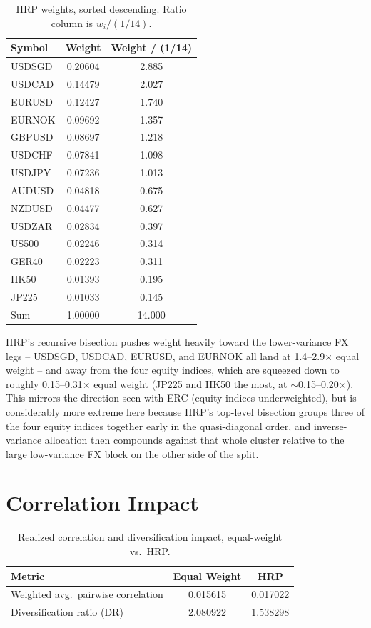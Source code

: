 \documentclass[11pt]{article}
\begin{document}
\begin{table}[h]
\centering
\caption{HRP weights, sorted descending. Ratio column is $w_i / (1/14)$.}
\begin{tabular}{lS[table-format=1.5]S[table-format=1.3]}
\toprule
Symbol & {Weight} & {Weight / (1/14)} \\
\midrule
USDSGD & 0.20604 & 2.885 \\
USDCAD & 0.14479 & 2.027 \\
EURUSD & 0.12427 & 1.740 \\
EURNOK & 0.09692 & 1.357 \\
GBPUSD & 0.08697 & 1.218 \\
USDCHF & 0.07841 & 1.098 \\
USDJPY & 0.07236 & 1.013 \\
AUDUSD & 0.04818 & 0.675 \\
NZDUSD & 0.04477 & 0.627 \\
USDZAR & 0.02834 & 0.397 \\
US500  & 0.02246 & 0.314 \\
GER40  & 0.02223 & 0.311 \\
HK50   & 0.01393 & 0.195 \\
JP225  & 0.01033 & 0.145 \\
\midrule
Sum & 1.00000 & 14.000 \\
\bottomrule
\end{tabular}
\end{table}

HRP's recursive bisection pushes weight heavily toward the lower-variance FX legs --
USDSGD, USDCAD, EURUSD, and EURNOK all land at 1.4--2.9$\times$ equal weight -- and
away from the four equity indices, which are squeezed down to roughly 0.15--0.31$\times$
equal weight (JP225 and HK50 the most, at $\sim$0.15--0.20$\times$). This mirrors the
direction seen with ERC (equity indices underweighted), but is considerably more
extreme here because HRP's top-level bisection groups three of the four equity indices
together early in the quasi-diagonal order, and inverse-variance allocation then
compounds against that whole cluster relative to the large low-variance FX block on
the other side of the split.

\section{Correlation Impact}

\begin{table}[h]
\centering
\caption{Realized correlation and diversification impact, equal-weight vs.\ HRP.}
\begin{tabular}{lS[table-format=1.6]S[table-format=1.6]}
\toprule
Metric & {Equal Weight} & {HRP} \\
\midrule
Weighted avg.\ pairwise correlation & 0.015615 & 0.017022 \\
Diversification ratio (DR) & 2.080922 & 1.538298 \\
\bottomrule
\end{tabular}
\end{table}
\end{document}
